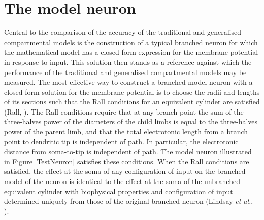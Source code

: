 \section{The model neuron}
Central to the comparison of the accuracy of the traditional and
generalised compartmental models is the construction of a typical
branched neuron for which the mathematical model has a closed form
expression for the membrane potential in response to input. This
solution then stands as a reference against which the performance
of the traditional and generalised compartmental models may be
measured. The most effective way to construct a branched model
neuron with a closed form solution for the membrane potential is
to choose the radii and lengths of its sections such that the Rall
conditions for an equivalent cylinder are satisfied (Rall,
\cite{Rall64}). The Rall conditions require that at any branch
point the sum of the three-halves power of the diameters of the
child limbs is equal to the three-halves power of the parent limb,
and that the total electrotonic length from a branch point to
dendritic tip is independent of path. In particular, the
electrotonic distance from soma-to-tip is independent of path. The
model neuron illustrated in Figure \ref{TestNeuron} satisfies
these conditions. When the Rall conditions are satisfied, the
effect at the soma of any configuration of input on the branched
model of the neuron is identical to the effect at the soma of the
unbranched equivalent cylinder with biophysical properties and
configuration of input determined uniquely from those of the
original branched neuron (Lindsay \emph{et al.},
\cite{Lindsay03}).

